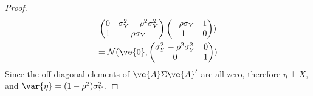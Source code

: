 \documentclass[11pt]{article}
\begin{document}
\begin{theorem}
\begin{proof}
\begin{gather}
\begin{pmatrix}
								0 & \sigma_Y^2 -\rho^2 \sigma_Y^2 \\
								1 & \rho \sigma_Y
							\end{pmatrix}
						\begin{pmatrix}
							- \rho \sigma_Y & 1 \\
							1 & 0
						\end{pmatrix}
						) \\
						= \mc{N}(
							\ve{0},
							\begin{pmatrix}
								\sigma_Y^2 -\rho^2 \sigma_Y^2 & 0 \\
								0 & 1
							\end{pmatrix}
						)
					\end{gather}
					Since the off-diagonal elements of $\ve{A}\Sigma \ve{A}'$ are all zero, therefore $\eta \perp X$, and $\var{\eta} = (1 - \rho^2) \sigma_Y^2$.
				\end{proof}
			\end{theorem}
						
\end{document}
